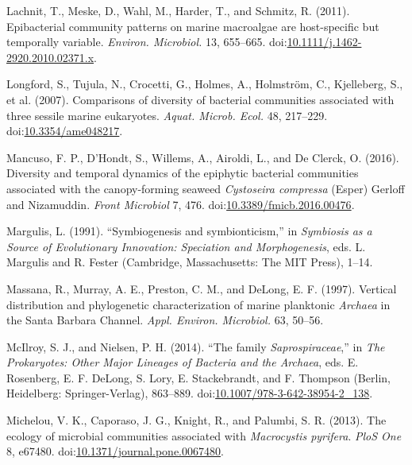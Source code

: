 \documentclass[
  12pt,
]{article}
\begin{document}
\leavevmode\hypertarget{ref-Lachnit2011}{}%
Lachnit, T., Meske, D., Wahl, M., Harder, T., and Schmitz, R. (2011).
Epibacterial community patterns on marine macroalgae are host-specific
but temporally variable. \emph{Environ. Microbiol.} 13, 655--665.
doi:\href{https://doi.org/10.1111/j.1462-2920.2010.02371.x}{10.1111/j.1462-2920.2010.02371.x}.

\leavevmode\hypertarget{ref-Longford2007}{}%
Longford, S., Tujula, N., Crocetti, G., Holmes, A., Holmström, C.,
Kjelleberg, S., et al. (2007). Comparisons of diversity of bacterial
communities associated with three sessile marine eukaryotes.
\emph{Aquat. Microb. Ecol.} 48, 217--229.
doi:\href{https://doi.org/10.3354/ame048217}{10.3354/ame048217}.

\leavevmode\hypertarget{ref-Mancuso2016}{}%
Mancuso, F. P., D'Hondt, S., Willems, A., Airoldi, L., and De Clerck, O.
(2016). Diversity and temporal dynamics of the epiphytic bacterial
communities associated with the canopy-forming seaweed \emph{Cystoseira
compressa} (Esper) Gerloff and Nizamuddin. \emph{Front Microbiol} 7,
476.
doi:\href{https://doi.org/10.3389/fmicb.2016.00476}{10.3389/fmicb.2016.00476}.

\leavevmode\hypertarget{ref-Margulis1991}{}%
Margulis, L. (1991). ``Symbiogenesis and symbionticism,'' in
\emph{Symbiosis as a Source of Evolutionary Innovation: Speciation and
Morphogenesis}, eds. L. Margulis and R. Fester (Cambridge,
Massachusetts: The MIT Press), 1--14.

\leavevmode\hypertarget{ref-Massana1997}{}%
Massana, R., Murray, A. E., Preston, C. M., and DeLong, E. F. (1997).
Vertical distribution and phylogenetic characterization of marine
planktonic \emph{Archaea} in the Santa Barbara Channel. \emph{Appl.
Environ. Microbiol.} 63, 50--56.

\leavevmode\hypertarget{ref-McIlroy2014}{}%
McIlroy, S. J., and Nielsen, P. H. (2014). ``The family
\emph{Saprospiraceae},'' in \emph{The Prokaryotes: Other Major Lineages
of Bacteria and the Archaea}, eds. E. Rosenberg, E. F. DeLong, S. Lory,
E. Stackebrandt, and F. Thompson (Berlin, Heidelberg: Springer-Verlag),
863--889.
doi:\href{https://doi.org/10.1007/978-3-642-38954-2_138}{10.1007/978-3-642-38954-2\_138}.

\leavevmode\hypertarget{ref-Michelou2013}{}%
Michelou, V. K., Caporaso, J. G., Knight, R., and Palumbi, S. R. (2013).
The ecology of microbial communities associated with \emph{Macrocystis
pyrifera}. \emph{PloS One} 8, e67480.
doi:\href{https://doi.org/10.1371/journal.pone.0067480}{10.1371/journal.pone.0067480}.
\end{document}
